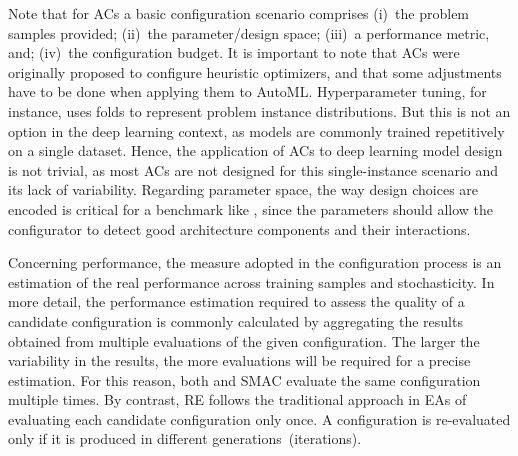 Note that for ACs a basic configuration scenario comprises (i)~the problem samples 
provided; (ii)~the parameter/design space; (iii)~a performance metric, and; (iv)~the configuration budget. It is important to note that ACs were originally proposed to configure heuristic optimizers, and that some adjustments have to be done when applying them to AutoML.
Hyperparameter tuning, for instance, uses folds to represent problem instance distributions. %
But this is not an option in the deep learning context, as models are commonly trained repetitively on a single dataset. Hence, the application of ACs to deep learning model design is not trivial, as most ACs are not designed for this single-instance scenario and its lack of variability. Regarding parameter space, 
the way design choices are encoded is critical for a benchmark like \nasbench, since the
parameters should allow the configurator to detect good architecture components and their interactions. 

Concerning performance, the measure adopted in the configuration process is an estimation of the real performance across training samples and stochasticity. In more detail, the  performance  estimation  required  to  assess  the  quality of a candidate configuration  is  commonly  calculated  by  aggregating the  results  obtained  from  multiple  evaluations  of  the  given configuration.  The  larger  the  variability  in  the  results,  the more  evaluations  will  be  required  for  a  precise  estimation. For this reason, both \irace and SMAC evaluate the same configuration multiple times. By contrast, RE follows the traditional approach in EAs of evaluating each candidate configuration only once. A configuration is re-evaluated only if it is produced in different generations~(iterations).

